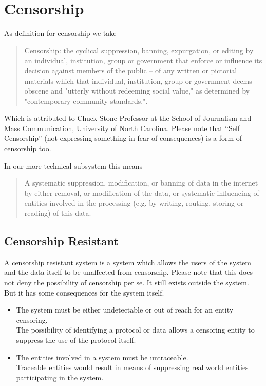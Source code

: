 \section{Censorship}
As definition for censorship we take
\begin{quote}
	Censorship: the cyclical suppression, banning, expurgation, or editing by an individual, institution, group or government that enforce or influence its decision against members of the public -- of any written or pictorial materials which that individual, institution, group or government deems obscene and "utterly without redeeming social value," as determined by "contemporary community standards.".
\end{quote}
Which is attributed to Chuck Stone Professor at the School of Journalism and Mass Communication, University of North Carolina. Please note that ``Self Censorship'' (not expressing something in fear of consequences) is a form of censorship too.

In our more technical subsystem this means
\begin{quote}
	A systematic suppression, modification, or banning of data in the internet by either removal, or modification of the data, or systematic influencing of entities involved in the processing (e.g. by writing, routing, storing or reading) of this data.
\end{quote}

\subsection{Censorship Resistant}
A censorship resistant system is a system which allows the users of the system and the data itself to be unaffected from censorship. Please note that this does not deny the possibility of censorship per se. It still exists outside the system. But it has some consequences for the system itself.

\begin{itemize}
	\item The system must be either undetectable or out of reach for an entity censoring.\\
	The possibility of identifying a protocol or data allows a censoring entity to suppress the use of the protocol itself. 
	\item The entities involved in a system must be untraceable.\\
	Traceable entities would result in means of suppressing real world entities participating in the system.
\end{itemize}

